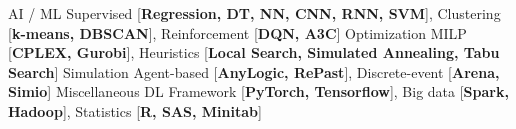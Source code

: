 


\begin{cvskills}
    \cvskill
    {AI / ML}
    {
        Supervised [\textbf{Regression, DT, NN, CNN, RNN, SVM}],
        Clustering [\textbf{k-means, DBSCAN}],
        Reinforcement [\textbf{DQN, A3C}]
    }
    \cvskill
    {Optimization}
    {
        MILP [\textbf{CPLEX, Gurobi}], 
        Heuristics [\textbf{Local Search, Simulated Annealing, Tabu Search}]
    }
    \cvskill
    {Simulation}
    {
        Agent-based [\textbf{AnyLogic, RePast}], 
        Discrete-event [\textbf{Arena, Simio}]
    }
    \cvskill
    {Miscellaneous}
    {
        DL Framework [\textbf{PyTorch, Tensorflow}],
        Big data [\textbf{Spark, Hadoop}], 
        Statistics [\textbf{R, SAS, Minitab}]
    }    
  

\end{cvskills}




